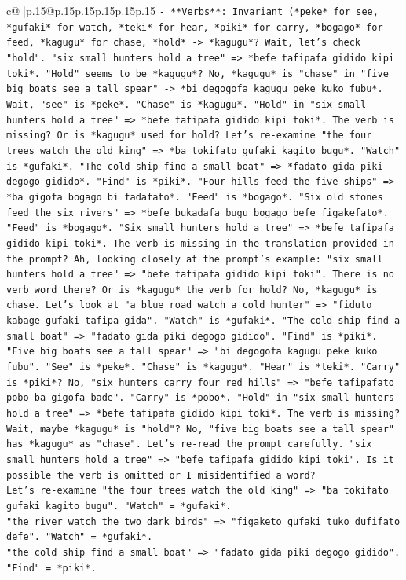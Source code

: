 \documentclass{article}
\begin{document}
{\begin{supertabular}{c@{$\;$}|p{.15\linewidth}@{}p{.15\linewidth}p{.15\linewidth}p{.15\linewidth}p{.15\linewidth}p{.15\linewidth}}
{{{\texttt{{-} **Verbs**: Invariant (*peke* for see, *gufaki* for watch, *teki* for hear, *piki* for carry, *bogago* for feed, *kagugu* for chase, *hold* {-}> *kagugu*? Wait, let's check "hold". "six small hunters hold a tree" => *befe tafipafa gidido kipi toki*. "Hold" seems to be *kagugu*? No, *kagugu* is "chase" in "five big boats see a tall spear" {-}> *bi degogofa kagugu peke kuko fubu*. Wait, "see" is *peke*. "Chase" is *kagugu*. "Hold" in "six small hunters hold a tree" => *befe tafipafa gidido kipi toki*. The verb is missing? Or is *kagugu* used for hold? Let's re{-}examine "the four trees watch the old king" => *ba tokifato gufaki kagito bugu*. "Watch" is *gufaki*. "The cold ship find a small boat" => *fadato gida piki degogo gidido*. "Find" is *piki*. "Four hills feed the five ships" => *ba gigofa bogago bi fadafato*. "Feed" is *bogago*. "Six old stones feed the six rivers" => *befe bukadafa bugu bogago befe figakefato*. "Feed" is *bogago*. "Six small hunters hold a tree" => *befe tafipafa gidido kipi toki*. The verb is missing in the translation provided in the prompt? Ah, looking closely at the prompt's example: "six small hunters hold a tree" => "befe tafipafa gidido kipi toki". There is no verb word there? Or is *kagugu* the verb for hold? No, *kagugu* is chase. Let's look at "a blue road watch a cold hunter" => "fiduto kabage gufaki tafipa gida". "Watch" is *gufaki*. "The cold ship find a small boat" => "fadato gida piki degogo gidido". "Find" is *piki*. "Five big boats see a tall spear" => "bi degogofa kagugu peke kuko fubu". "See" is *peke*. "Chase" is *kagugu*. "Hear" is *teki*. "Carry" is *piki*? No, "six hunters carry four red hills" => "befe tafipafato pobo ba gigofa bade". "Carry" is *pobo*. "Hold" in "six small hunters hold a tree" => *befe tafipafa gidido kipi toki*. The verb is missing? Wait, maybe *kagugu* is "hold"? No, "five big boats see a tall spear" has *kagugu* as "chase". Let's re{-}read the prompt carefully. "six small hunters hold a tree" => "befe tafipafa gidido kipi toki". Is it possible the verb is omitted or I misidentified a word?} \\
\texttt{Let's re{-}examine "the four trees watch the old king" => "ba tokifato gufaki kagito bugu". "Watch" = *gufaki*.} \\
\texttt{"the river watch the two dark birds" => "figaketo gufaki tuko dufifato defe". "Watch" = *gufaki*.} \\
\texttt{"the cold ship find a small boat" => "fadato gida piki degogo gidido". "Find" = *piki*.} \\
}}}
\end{supertabular}}
\end{document}
